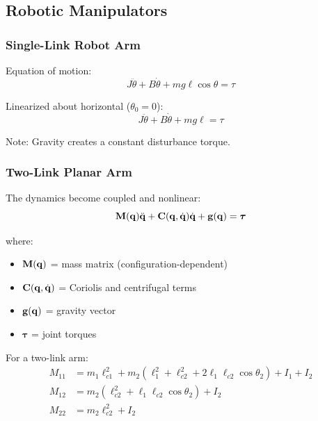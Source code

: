 \subsection{Robotic Manipulators}
\label{subsec:robotics}

\subsubsection{Single-Link Robot Arm}



Equation of motion:
\begin{equation}
J\ddot{\theta} + B\dot{\theta} + mg\ell\cos\theta = \tau
\end{equation}

Linearized about horizontal ($\theta_0 = 0$):
\begin{equation}
J\ddot{\theta} + B\dot{\theta} + mg\ell = \tau
\end{equation}

Note: Gravity creates a constant disturbance torque.

\subsubsection{Two-Link Planar Arm}

The dynamics become coupled and nonlinear:
\begin{equation}
\mathbf{M}(\mathbf{q})\ddot{\mathbf{q}} + \mathbf{C}(\mathbf{q}, \dot{\mathbf{q}})\dot{\mathbf{q}} + \mathbf{g}(\mathbf{q}) = \boldsymbol{\tau}
\end{equation}

where:
\begin{itemize}
    \item $\mathbf{M}(\mathbf{q})$ = mass matrix (configuration-dependent)
    \item $\mathbf{C}(\mathbf{q}, \dot{\mathbf{q}})$ = Coriolis and centrifugal terms
    \item $\mathbf{g}(\mathbf{q})$ = gravity vector
    \item $\boldsymbol{\tau}$ = joint torques
\end{itemize}

For a two-link arm:
\begin{align}
M_{11} &= m_1 \ell_{c1}^2 + m_2(\ell_1^2 + \ell_{c2}^2 + 2\ell_1\ell_{c2}\cos\theta_2) + I_1 + I_2 \\
M_{12} &= m_2(\ell_{c2}^2 + \ell_1\ell_{c2}\cos\theta_2) + I_2 \\
M_{22} &= m_2\ell_{c2}^2 + I_2
\end{align}

